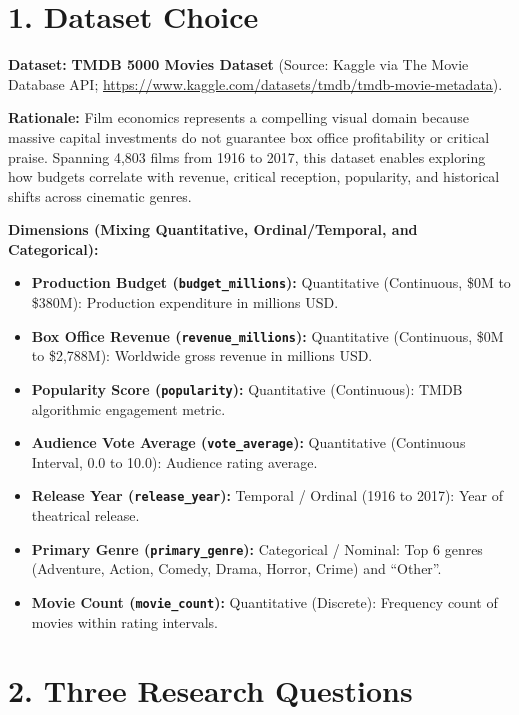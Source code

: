 \documentclass[10pt,a4paper]{article}
\begin{document}
\vspace{0.2em}

\section*{1. Dataset Choice}

\textbf{Dataset:} \textbf{TMDB 5000 Movies Dataset} (Source: Kaggle via The Movie Database API; \url{https://www.kaggle.com/datasets/tmdb/tmdb-movie-metadata}).

\textbf{Rationale:} Film economics represents a compelling visual domain because massive capital investments do not guarantee box office profitability or critical praise. Spanning 4,803 films from 1916 to 2017, this dataset enables exploring how budgets correlate with revenue, critical reception, popularity, and historical shifts across cinematic genres.

\textbf{Dimensions (Mixing Quantitative, Ordinal/Temporal, and Categorical):}
\begin{itemize}\setlength{\itemsep}{0.5pt}\setlength{\parskip}{0pt}\setlength{\parsep}{0pt}
    \item \textbf{Production Budget (\texttt{budget\_millions}):} Quantitative (Continuous, \$0M to \$380M): Production expenditure in millions USD.
    \item \textbf{Box Office Revenue (\texttt{revenue\_millions}):} Quantitative (Continuous, \$0M to \$2,788M): Worldwide gross revenue in millions USD.
    \item \textbf{Popularity Score (\texttt{popularity}):} Quantitative (Continuous): TMDB algorithmic engagement metric.
    \item \textbf{Audience Vote Average (\texttt{vote\_average}):} Quantitative (Continuous Interval, 0.0 to 10.0): Audience rating average.
    \item \textbf{Release Year (\texttt{release\_year}):} Temporal / Ordinal (1916 to 2017): Year of theatrical release.
    \item \textbf{Primary Genre (\texttt{primary\_genre}):} Categorical / Nominal: Top 6 genres (Adventure, Action, Comedy, Drama, Horror, Crime) and ``Other''.
    \item \textbf{Movie Count (\texttt{movie\_count}):} Quantitative (Discrete): Frequency count of movies within rating intervals.
\end{itemize}

\section*{2. Three Research Questions}
\end{document}
